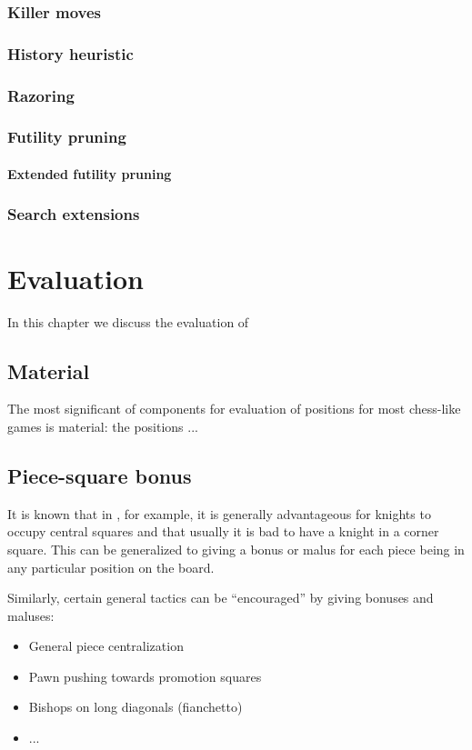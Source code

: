 \documentclass[10pt,dvipdfmx]{report}
\newcommand{\g}[1]{{\sc{#1}}\index{{\sc{#1}}}}
\begin{document}
\subsection{Killer moves}
\subsection{History heuristic}
\subsection{Razoring}
\subsection{Futility pruning}
\subsubsection{Extended futility pruning}
\subsection{Search extensions}

\chapter{Evaluation}
\label{chap-evaluation}

In this chapter we discuss the evaluation of

\section{Material}
The most significant of components for evaluation
of positions for most chess-like games is material:
the positions ...

\section{Piece-square bonus}
It is known that in \g{chess}, for example, it is generally
advantageous for knights to occupy central squares and that
usually it is bad to have a knight in a corner square.  This
can be generalized to giving a bonus or malus for each piece
being in any particular position on the board.

Similarly, certain general tactics can be ``encouraged'' by
giving bonuses and maluses:
\begin{itemize}
  \item General piece centralization
  \item Pawn pushing towards promotion squares
  \item Bishops on long diagonals (fianchetto)
  \item ...
\end{itemize}
\end{document}
